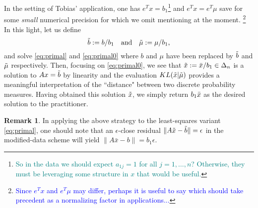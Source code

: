 \documentclass[10pt,a4paper]{article}
\numberwithin{equation}{section}
\theoremstyle{definition}
\newtheorem{remark}[theorem]{Remark}
\begin{document}
In the setting of Tobias' application, one has $e^Tx = b_1$\footnote{\textcolor{teal}{So in the data we should expect $a_{1j}=1$ for all $j=1,\dots,n$? Otherwise, they must be leveraging some structure in $x$ that would be useful.}} and $e^Tx = e^T\mu$ save for some \emph{small} numerical precision for which we omit mentioning at the moment. \footnote{\textcolor{blue}{Since $e^Tx$ and $e^T\mu$ may differ, perhaps it is useful to say which should take precedent as a normalizing factor in applications...}} In this light, let us define 
\[
\Tilde{b} := b/b_1
\quad\text{and}\quad
\Tilde{\mu} := \mu/b_1,
\]
and solve \eqref{eq:primal} and \eqref{eq:primal0} where $b$ and $\mu$ have been replaced by $\Tilde{b}$ and $\Tilde{\mu}$ respectively. Then, focusing on \eqref{eq:primal0}, we see that $\Tilde{x}:= \Bar{x}/b_1 \in \Delta_n$ is a solution to $Ax = \Tilde{b}$ by linearity and the evaluation $KL(\Tilde{x}|\Tilde{\mu})$ provides a meaningful interpretation of the ``distance" between two discrete probability measures. Having obtained this solution $\Tilde{x}$, we simply return $b_1 \Bar{x}$ as the desired solution to the practitioner. 

\begin{remark}
    In applying the above strategy to the least-squares variant \eqref{eq:primal}, one should note that an $\epsilon$-close residual $\lVert A\Tilde{x}- \Tilde{b} \rVert = \epsilon$ in the modified-data scheme will yield $\lVert A\bar{x}- b \rVert = b_1 \epsilon$.
\end{remark}


 
\end{document}
